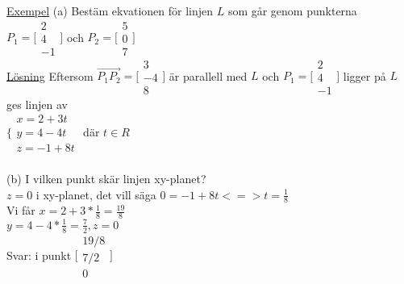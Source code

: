 \documentclass{article}
\begin{document}
\underline{Exempel} (a) Bestäm ekvationen för linjen \(L\) som går genom punkterna \(P_1 = \bigl[\begin{smallmatrix}
2 \\ 4 \\ -1
\end{smallmatrix} \bigr] \) och \(P_2 = \bigl[\begin{smallmatrix}
5 \\ 0 \\ 7
\end{smallmatrix} \bigr] \)\\
\underline{Lösning} Eftersom \(\vec{P_1 P_2} = \bigl[\begin{smallmatrix}
3 \\ -4 \\ 8
\end{smallmatrix} \bigr] \) är parallell med \(L\) och \(P_1 = \bigl[\begin{smallmatrix}
2 \\ 4 \\ -1
\end{smallmatrix} \bigr] \) ligger på \(L\) ges linjen av\\
\(\bigl\{\begin{smallmatrix}
x = 2 + 3t \\ y = 4 - 4t \\ z = -1 + 8t
\end{smallmatrix} \) där \(t \in R\)\\
\\
(b) I vilken punkt skär linjen xy-planet?\\
\(z=0 \) i xy-planet, det vill säga \(0 = -1 + 8t <=> t = \frac{1}{8} \)\\
Vi får \(x = 2 + 3 * \frac{1}{8} = \frac{19}{8} \)\\
\(y = 4 - 4 * \frac{1}{8} = \frac{7}{2}, z = 0 \)\\
Svar: i punkt \(\bigl[\begin{smallmatrix}
19/8 \\ 7/2 \\ 0
\end{smallmatrix} \bigr] \)
\end{document}
